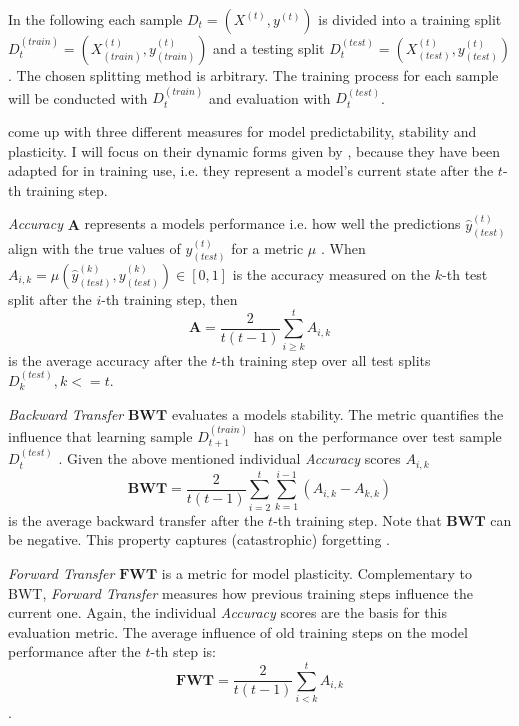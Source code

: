 In the following each sample $D_t = (X^{(t)}, y^{(t)})$ is divided into a training split $D_t^{(train)} = (X^{(t)}_{(train)}, y^{(t)}_{(train)})$ and a testing split $D_t^{(test)} = (X^{(t)}_{(test)}, y^{(t)}_{(test)})$. The chosen splitting method is arbitrary. The training process for each sample will be conducted with $D_t^{(train)}$ and evaluation with $D_t^{(test)}$.

\citeauthor{lopezpaz2022gradientepisodicmemorycontinual} \cite{lopezpaz2022gradientepisodicmemorycontinual} come up with three different measures for model predictability, stability and plasticity. I will focus on their dynamic forms given by \citeauthor{díazrodríguez2018dontforgetforgettingnew} \cite{díazrodríguez2018dontforgetforgettingnew}, because they have been adapted for in training use, i.e. they represent a model's current state after the $t$-th training step.

\textit{Accuracy} $\mathbf{A}$ represents a models performance i.e. how well the predictions $\hat{y}^{(t)}_{(test)}$ align with the true values of $y^{(t)}_{(test)}$ for a metric $\mu$ . When $A_{i,k} = \mu(\hat{y}_{(test)}^{(k)}, y_{(test)}^{(k)}) \in [0,1]$ is the accuracy measured on the $k$-th test split after the $i$-th training step, then
\begin{equation}
	\mathbf{A} = \frac{2}{t(t-1)}\sum_{i \geq k }^{t} A_{i,k}
\end{equation}
is the average accuracy after the $t$-th training step over all test splits $D_k^{(test)}, k <= t$.

\textit{Backward Transfer} $\mathbf{BWT}$ evaluates a models stability. The metric quantifies the influence that learning sample $D_{t+1}^{(train)}$ has on the performance over test sample $D_t^{(test)}$ \cite{lopezpaz2022gradientepisodicmemorycontinual}. Given the above mentioned individual \textit{Accuracy} scores $A_{i,k}$
\begin{equation}
	\mathbf{BWT} = \frac{2}{t(t-1)} \sum_{i=2}^{t}\sum_{k=1}^{i-1}(A_{i,k}-A_{k,k})
\end{equation}
is the average backward transfer after the $t$-th training step. Note that $\mathbf{BWT}$ can be negative. This property captures (catastrophic) forgetting \cite{LW}.

\textit{Forward Transfer} $\mathbf{FWT}$ is a metric for model plasticity. Complementary to BWT, \textit{Forward Transfer} measures how previous training steps influence the current one. Again, the individual \textit{Accuracy} scores are the basis for this evaluation metric. The average influence of old training steps on the model performance after the $t$-th step is:
\begin{equation}
	\mathbf{FWT} = \frac{2}{t(t-1)}\sum_{i < k }^{t} A_{i,k}
\end{equation}.

